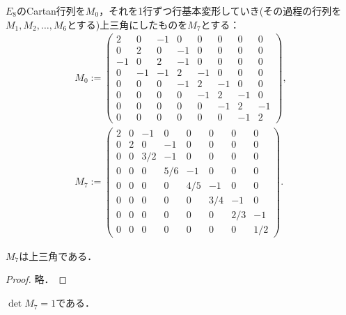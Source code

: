 \begin{definition}
  \label{def:M0-M7}
  \leanok
  $E_8$のCartan行列を$M_0$，それを1行ずつ行基本変形していき(その過程の行列を$M_1, M_2, \ldots, M_6$とする)上三角にしたものを$M_7$とする：
  \begin{gather}
    M_0 :=
    \begin{pmatrix}
      2 & 0 & -1 & 0 & 0 & 0 & 0 & 0 \\
      0 & 2 & 0 & -1 & 0 & 0 & 0 & 0 \\
      -1 & 0 & 2 & -1 & 0 & 0 & 0 & 0 \\
      0 & -1 & -1 & 2 & -1 & 0 & 0 & 0 \\
      0 & 0 & 0 & -1 & 2 & -1 & 0 & 0 \\
      0 & 0 & 0 & 0 & -1 & 2 & -1 & 0 \\
      0 & 0 & 0 & 0 & 0 & -1 & 2 & -1 \\
      0 & 0 & 0 & 0 & 0 & 0 & -1 & 2
    \end{pmatrix},\\
    M_7 :=
    \begin{pmatrix}
      2 & 0 & -1 & 0 & 0 & 0 & 0 & 0 \\
      0 & 2 & 0 & -1 & 0 & 0 & 0 & 0 \\
      0 & 0 & 3/2 & -1 & 0 & 0 & 0 & 0 \\
      0 & 0 & 0 & 5/6 & -1 & 0 & 0 & 0 \\
      0 & 0 & 0 & 0 & 4/5 & -1 & 0 & 0 \\
      0 & 0 & 0 & 0 & 0 & 3/4 & -1 & 0 \\
      0 & 0 & 0 & 0 & 0 & 0 & 2/3 & -1 \\
      0 & 0 & 0 & 0 & 0 & 0 & 0 & 1/2
    \end{pmatrix}.
  \end{gather}
\end{definition}

\begin{lemma}
  \label{lem:M7_upperTrianglar}
  \leanok
  $M_7$は上三角である．
\end{lemma}

\begin{proof}
  \leanok
  略．
\end{proof}

\begin{lemma}
  \label{lem:M7_det}
  \leanok
  $\det M_7 = 1$である．
\end{lemma}

